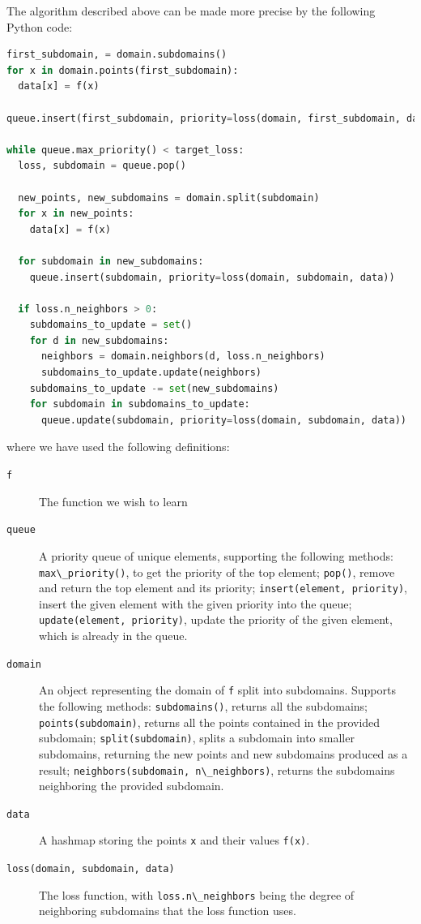 
The algorithm described above can be made more precise by the following Python code:

\begin{lstlisting}[language=Python]
first_subdomain, = domain.subdomains()
for x in domain.points(first_subdomain):
  data[x] = f(x)

queue.insert(first_subdomain, priority=loss(domain, first_subdomain, data))

while queue.max_priority() < target_loss:
  loss, subdomain = queue.pop()

  new_points, new_subdomains = domain.split(subdomain)
  for x in new_points:
    data[x] = f(x)

  for subdomain in new_subdomains:
    queue.insert(subdomain, priority=loss(domain, subdomain, data))

  if loss.n_neighbors > 0:
    subdomains_to_update = set()
    for d in new_subdomains:
      neighbors = domain.neighbors(d, loss.n_neighbors)
      subdomains_to_update.update(neighbors)
    subdomains_to_update -= set(new_subdomains)
    for subdomain in subdomains_to_update:
      queue.update(subdomain, priority=loss(domain, subdomain, data))
\end{lstlisting}

where we have used the following definitions:

\begin{description}
\item[\texttt{f}]
The function we wish to learn
\item[\texttt{queue}]
A priority queue of unique elements, supporting the following methods:\\ \passthrough{\lstinline!max\_priority()!}, to get the priority of the top element; \passthrough{\lstinline!pop()!}, remove and return the top element and its priority; \passthrough{\lstinline!insert(element, priority)!}, insert the given element with the given priority into the queue; \passthrough{\lstinline!update(element, priority)!}, update the priority of the given element, which is already in the queue.
\item[\texttt{domain}]
An object representing the domain of \passthrough{\lstinline!f!} split into subdomains. Supports the following methods: \passthrough{\lstinline!subdomains()!}, returns all the subdomains; \passthrough{\lstinline!points(subdomain)!}, returns all the points contained in the provided subdomain; \passthrough{\lstinline!split(subdomain)!}, splits a subdomain into smaller subdomains, returning the new points and new subdomains produced as a result; \passthrough{\lstinline!neighbors(subdomain, n\_neighbors)!}, returns the subdomains neighboring the provided subdomain.
\item[\texttt{data}]
A hashmap storing the points \passthrough{\lstinline!x!} and their values \passthrough{\lstinline!f(x)!}.
\item[\texttt{loss(domain,\ subdomain,\ data)}]
The loss function, with \passthrough{\lstinline!loss.n\_neighbors!} being the degree of neighboring subdomains that the loss function uses.
\end{description}

